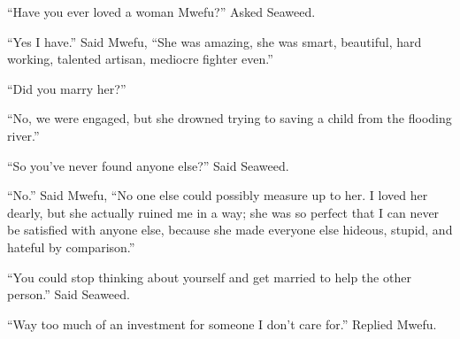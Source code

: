 ``Have you ever loved a woman Mwefu?'' Asked Seaweed.

``Yes I have.'' Said Mwefu, ``She was amazing, she was smart, beautiful, hard working, talented artisan, mediocre fighter even.''

``Did you marry her?''

``No, we were engaged, but she drowned trying to saving a child from the flooding river.''

``So you've never found anyone else?'' Said Seaweed.

``No.'' Said Mwefu, ``No one else could possibly measure up to her. I loved her dearly, but she actually ruined me in a way; she was so perfect that I can never be satisfied with anyone else, because she made everyone else hideous, stupid, and hateful by comparison.''

``You could stop thinking about yourself and get married to help the other person.'' Said Seaweed.

``Way too much of an investment for someone I don't care for.'' Replied Mwefu.
